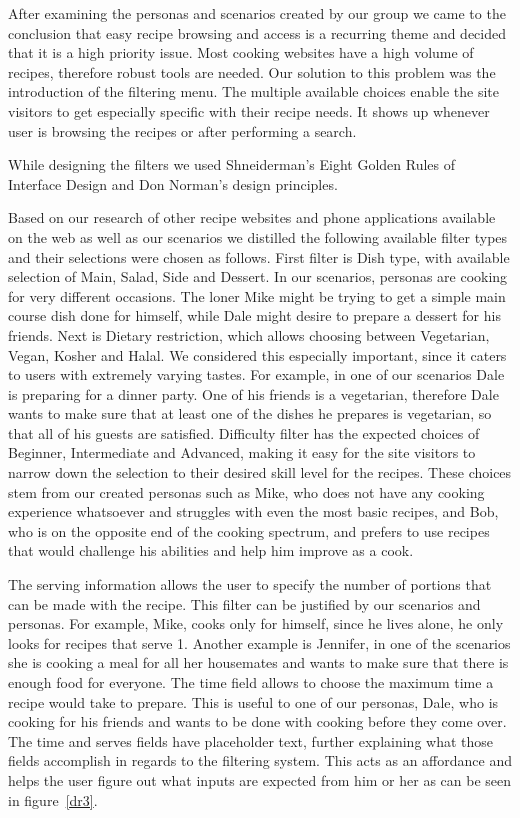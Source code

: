 After examining the personas and scenarios created by our group we came to the conclusion that easy recipe browsing and access is a recurring theme and decided that it is a high priority issue. Most cooking websites have a high volume of recipes, therefore robust tools are needed. Our solution to this problem was the introduction of the filtering menu. The multiple available choices enable the site visitors to get especially specific with their recipe needs. It shows up whenever user is browsing the recipes or after performing a search.

While designing the filters we used Shneiderman’s Eight Golden Rules of Interface Design and Don Norman’s design principles.

Based on our research of other recipe websites and phone applications available on the web as well as our scenarios we distilled the following available filter types and their selections were chosen as follows. First filter is Dish type, with available selection of Main, Salad, Side and Dessert. In our scenarios, personas are cooking for very different occasions. The loner Mike might be trying to get a simple main course dish done for himself, while Dale might desire to prepare a dessert for his friends.  Next is Dietary restriction, which allows choosing between Vegetarian, Vegan, Kosher and Halal. We considered this especially important, since it caters to users with extremely varying tastes. For example, in one of our scenarios Dale is preparing for a dinner party. One of his friends is a vegetarian, therefore Dale wants to make sure that at least one of the dishes he prepares is vegetarian, so that all of his guests are satisfied. Difficulty filter has the expected choices of Beginner, Intermediate and Advanced, making it easy for the site visitors to narrow down the selection to their desired skill level for the recipes. These choices stem from our created personas such as Mike, who does not have any cooking experience whatsoever and struggles with even the most basic recipes, and Bob, who is on the opposite end of the cooking spectrum, and prefers to use recipes that would challenge his abilities and help him improve as a cook.  

The serving information allows the user to specify the number of
portions that can be made with the recipe. This filter can be
justified by our scenarios and personas. For example, Mike, cooks only
for himself, since he lives alone, he only looks for recipes that
serve 1. Another example is Jennifer, in one of the scenarios she is cooking a meal for all her housemates and wants to make sure that there is enough food for everyone. The time field allows to choose the maximum time a recipe would take to prepare. This is useful to one of our personas, Dale, who is cooking for his friends and wants to be done with cooking before they come over. The time and serves fields have placeholder text, further explaining what those fields accomplish in regards to the filtering system. This acts as an affordance and helps the user figure out what inputs are expected from him or her as can be seen in figure~\ref{dr3}.

